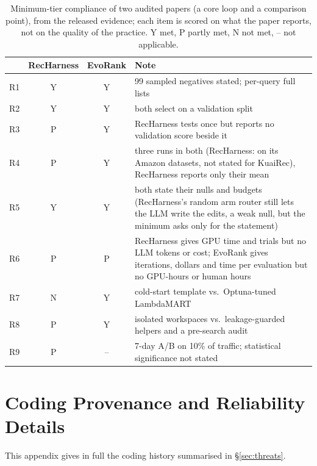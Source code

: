 \documentclass[sigconf,nonacm]{acmart}
\newcommand{\yes}{\textsf{Y}\xspace}
\newcommand{\no}{\textsf{N}\xspace}
\newcommand{\pa}{\textsf{P}\xspace}
\newcommand{\na}{\textsf{--}\xspace}
\begin{document}
\begin{table}[h]
\caption{Minimum-tier compliance of two audited papers (a core loop and a comparison point), from the released evidence; each item is scored on what the paper reports, not on the quality of the practice. \yes met, \pa partly met, \no
not met, \na not applicable.}\label{tab:exemplars}
\small
\begin{tabularx}{\columnwidth}{@{}lccX@{}}
\toprule
& RecHarness & EvoRank & Note \\
\midrule
R1 & \yes & \yes & 99 sampled negatives stated; per-query full lists \\
R2 & \yes & \yes & both select on a validation split \\
R3 & \pa & \yes & RecHarness tests once but reports no validation score beside it \\
R4 & \pa & \yes & three runs in both (RecHarness: on its Amazon datasets, not stated for KuaiRec), RecHarness reports only their mean \\
R5 & \yes & \yes & both state their nulls and budgets (RecHarness's random arm router still lets the LLM write the edits, a weak null, but the minimum asks only for the statement) \\
R6 & \pa & \pa & RecHarness gives GPU time and trials but no LLM tokens or cost; EvoRank gives iterations, dollars and time per evaluation but no GPU-hours or human hours \\
R7 & \no & \yes & cold-start template vs.\ Optuna-tuned LambdaMART \\
R8 & \pa & \yes & isolated workspaces vs.\ leakage-guarded helpers and a pre-search audit \\
R9 & \pa & \na & 7-day A/B on 10\% of traffic; statistical significance not stated \\
\bottomrule
\end{tabularx}
\end{table}

\section{Coding Provenance and Reliability Details}\label{app:provenance}

This appendix gives in full the coding history summarised in \S\ref{sec:threats}.
\end{document}
